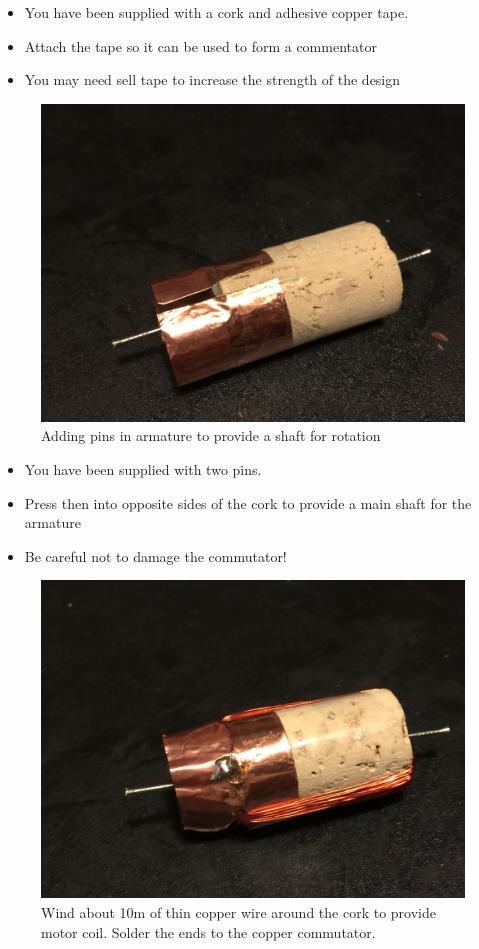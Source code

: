 \documentclass{instructions}
\begin{document}
\begin{itemize}
\item You have been supplied with a cork and adhesive copper tape.
\item Attach the tape so it can be used to form a commentator
\item You may need sell tape to increase the strength of the design
\end{itemize}


\begin{figure}
    \centering
    \includegraphics[width=0.8\linewidth]{dc-motor-001}
    \caption{Adding pins in armature to provide a shaft for rotation}
    \label{fig2}
\end{figure}


\begin{itemize}
\item You have been supplied with two pins.
\item Press then into opposite sides of the cork to provide a main shaft for
  the armature
\item Be careful not to damage the commutator!
\end{itemize}


\begin{figure}
    \centering
    \includegraphics[width=0.6\linewidth]{dc-motor-002}
    \caption{Wind about 10m of thin copper wire around the cork to provide
    motor coil. Solder the ends to the copper commutator.}

    \label{fig3}
\end{figure}
\end{document}
